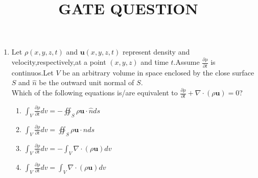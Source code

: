 \documentclass{article}
\begin{document}
\title{GATE QUESTION}
\begin{enumerate}
	\item Let $\rho(x,y,z,t)$ and $\mathbf{u}(x,y,z,t)$ represent density and velocity,respectively,at a point $(x,y,z)$ and time $t$.Assume $\frac{\partial\rho}{\partial t}$ is continuos.Let $V$ be an arbitrary volume in space enclosed by the close surface $S$ and $\hat{n}$ be the outward unit normal of $S$.\\
		Which of the following equations is/are equivalent to $\frac{\partial\rho}{\partial t}+\nabla\cdot(\rho\mathbf{u})=0$?
		\begin{enumerate}[label=(\Alph*)]
			\item $
\int_{V}\frac{\partial \rho}{\partial t} dv = -\oiint_{S} \rho \mathbf{u} \cdot \hat{n}  ds$
\item $\int_{V}\frac{\partial \rho}{\partial t} dv = \oiint_{S} \rho \mathbf{u} \cdot \hat{n} ds$
			\item $\int_{V}\frac{\partial \rho}{\partial t} dv= -\int_{V} \nabla \cdot(\rho \mathbf{u}) dv$
			\item $\int_{V}\frac{\partial \rho}{\partial t} dv= \int_{V}\nabla \cdot(\rho \mathbf{u}) dv$
		\end{enumerate}
\end{enumerate}
\end{document}
